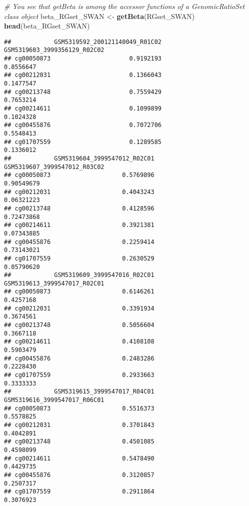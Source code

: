 \documentclass[
]{article}
\newenvironment{Shaded}{\begin{snugshade}}{\end{snugshade}}
\newcommand{\CommentTok}[1]{\textcolor[rgb]{0.56,0.35,0.01}{\textit{#1}}}
\newcommand{\FunctionTok}[1]{\textcolor[rgb]{0.13,0.29,0.53}{\textbf{#1}}}
\newcommand{\NormalTok}[1]{#1}
\newcommand{\OtherTok}[1]{\textcolor[rgb]{0.56,0.35,0.01}{#1}}
\begin{document}
\begin{Shaded}
\begin{Highlighting}[]
\CommentTok{\# You see that getBeta is among the accessor functions of a GenomicRatioSet class object}
\NormalTok{beta\_RGset\_SWAN }\OtherTok{\textless{}{-}} \FunctionTok{getBeta}\NormalTok{(RGset\_SWAN)}
\FunctionTok{head}\NormalTok{(beta\_RGset\_SWAN)}
\end{Highlighting}
\end{Shaded}

\begin{verbatim}
##            GSM5319592_200121140049_R01C02 GSM5319603_3999356129_R02C02
## cg00050873                      0.9192193                    0.8556647
## cg00212031                      0.1366043                    0.1477547
## cg00213748                      0.7559429                    0.7653214
## cg00214611                      0.1099899                    0.1024328
## cg00455876                      0.7072706                    0.5548413
## cg01707559                      0.1289585                    0.1336012
##            GSM5319604_3999547012_R02C01 GSM5319607_3999547012_R03C02
## cg00050873                    0.5769896                   0.90549679
## cg00212031                    0.4043243                   0.06321223
## cg00213748                    0.4128596                   0.72473868
## cg00214611                    0.3921381                   0.07343885
## cg00455876                    0.2259414                   0.73143021
## cg01707559                    0.2630529                   0.05790620
##            GSM5319609_3999547016_R02C01 GSM5319613_3999547017_R02C01
## cg00050873                    0.6146261                    0.4257168
## cg00212031                    0.3391934                    0.3674561
## cg00213748                    0.5056604                    0.3667118
## cg00214611                    0.4108108                    0.5903479
## cg00455876                    0.2483286                    0.2228430
## cg01707559                    0.2933663                    0.3333333
##            GSM5319615_3999547017_R04C01 GSM5319616_3999547017_R06C01
## cg00050873                    0.5516373                    0.5578825
## cg00212031                    0.3701843                    0.4042891
## cg00213748                    0.4501085                    0.4598099
## cg00214611                    0.5478490                    0.4429735
## cg00455876                    0.3120857                    0.2507317
## cg01707559                    0.2911864                    0.3076923
\end{verbatim}
\end{document}
